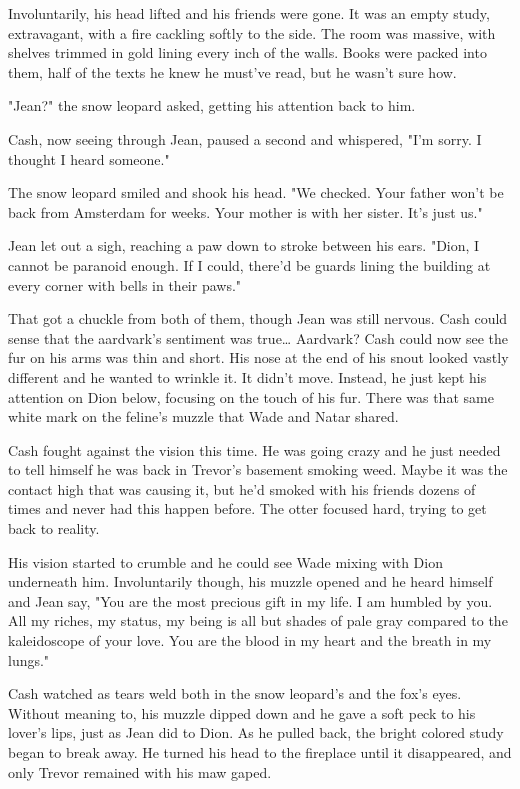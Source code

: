 Involuntarily, his head lifted and his friends were gone. It was an empty study, extravagant, with a fire cackling softly to the side. The room was massive, with shelves trimmed in gold lining every inch of the walls. Books were packed into them, half of the texts he knew he must've read, but he wasn't sure how.

"Jean?" the snow leopard asked, getting his attention back to him.

Cash, now seeing through Jean, paused a second and whispered, "I'm sorry. I thought I heard someone."

The snow leopard smiled and shook his head. "We checked. Your father won't be back from Amsterdam for weeks. Your mother is with her sister. It's just us."

Jean let out a sigh, reaching a paw down to stroke between his ears. "Dion, I cannot be paranoid enough. If I could, there'd be guards lining the building at every corner with bells in their paws."

That got a chuckle from both of them, though Jean was still nervous. Cash could sense that the aardvark's sentiment was true\ldots{} Aardvark? Cash could now see the fur on his arms was thin and short. His nose at the end of his snout looked vastly different and he wanted to wrinkle it. It didn't move. Instead, he just kept his attention on Dion below, focusing on the touch of his fur. There was that same white mark on the feline's muzzle that Wade and Natar shared.

Cash fought against the vision this time. He was going crazy and he just needed to tell himself he was back in Trevor's basement smoking weed. Maybe it was the contact high that was causing it, but he'd smoked with his friends dozens of times and never had this happen before. The otter focused hard, trying to get back to reality.

His vision started to crumble and he could see Wade mixing with Dion underneath him. Involuntarily though, his muzzle opened and he heard himself and Jean say, "You are the most precious gift in my life. I am humbled by you. All my riches, my status, my being is all but shades of pale gray compared to the kaleidoscope of your love. You are the blood in my heart and the breath in my lungs."

Cash watched as tears weld both in the snow leopard's and the fox's eyes. Without meaning to, his muzzle dipped down and he gave a soft peck to his lover's lips, just as Jean did to Dion. As he pulled back, the bright colored study began to break away. He turned his head to the fireplace until it disappeared, and only Trevor remained with his maw gaped.

